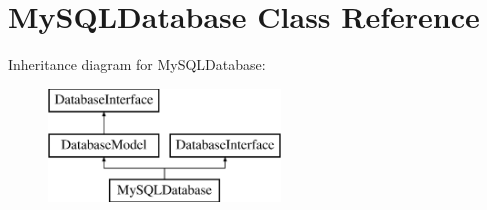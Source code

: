\hypertarget{class_my_s_q_l_database}{}\section{My\+S\+Q\+L\+Database Class Reference}
\label{class_my_s_q_l_database}
Inheritance diagram for My\+S\+Q\+L\+Database\+:\begin{figure}[H]
\begin{center}
\leavevmode
\includegraphics[height=3.000000cm]{class_my_s_q_l_database}
\end{center}
\end{figure}
